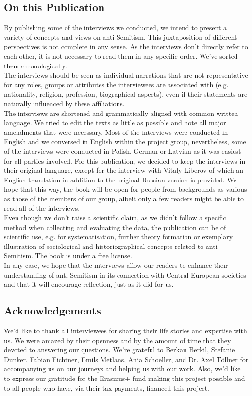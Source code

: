 \subsection*{On this Publication}
By publishing some of the interviews we conducted, we intend to present a variety of concepts and views on anti-Semitism. This juxtaposition of different perspectives is not complete in any sense. As the interviews don’t directly refer to each other, it is not necessary to read them in any specific order. We've sorted them chronologically. \\ 
The interviews should be seen as individual narrations that are not representative for any roles, groups or attributes the interviewees are associated with (e.g. nationality, religion, profession, biographical aspects), even if their statements are naturally influenced by these affiliations. \\
The interviews are shortened and grammatically aligned with common written language. We tried to edit the texts as little as possible and note all major amendments that were necessary. Most of the interviews were conducted in English and we conversed in English within the project group, nevertheless, some of the interviews were conducted in Polish, German or Latvian as it was easiest for all parties involved. For this publication, we decided to keep the interviews in their original language, except for the interview with Vitaly Liberov of which an English translation in addition to the original Russian version is provided. We hope that this way, the book will be open for people from backgrounds as various as those of the members of our group, albeit only a few readers might be able to read all of the interviews.\\
Even though we don’t raise a scientific claim, as we didn’t follow a specific method when collecting and evaluating the data, the publication can be of scientific use, e.g. for systematisation, further theory formation or exemplary illustration of sociological and historiographical concepts related to anti-Semitism. The book is under a free license.\\
In any case, we hope that the interviews allow our readers to enhance their understanding of anti-Semitism in its connection with Central European societies and that it will encourage reflection, just as it did for us. 
\subsection*{Acknowledgements}
We’d like to thank all interviewees for sharing their life stories and expertise with us. We were amazed by their openness and by the amount of time that they devoted to answering our questions. We're grateful to Berkan Berkil, Stefanie Dunker, Fabian Fichtner, Emils Metlans, Anja Schoeller, and Dr. Axel Töllner for accompanying us on our journeys and helping us with our work. Also, we'd like to express our gratitude for the Erasmus+ fund making this project possible and to all people who have, via their tax payments, financed this project. 
